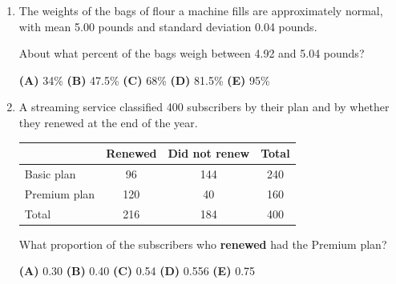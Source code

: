 \documentclass[12pt]{article}
\begin{document}
\begin{enumerate}[leftmargin=1.9em, itemsep=0.13in]
  \boxguard[8]
  \item The weights of the bags of flour a machine fills are approximately normal, with mean
        5.00 pounds and standard deviation 0.04 pounds.

        About what percent of the bags weigh between 4.92 and 5.04 pounds?\hfill{}\rule[-0.2in]{0pt}{0.48in}
        \par\vspace{3pt}\noindent
        \hspace{1.2em}\textbf{(A)} 34\% \hfill \textbf{(B)} 47.5\% \hfill
        \textbf{(C)} 68\% \hfill \textbf{(D)} 81.5\% \hfill \textbf{(E)} 95\%

  \boxguard[13]
  \item A streaming service classified 400 subscribers by their plan and by whether they
        renewed at the end of the year.

        \vspace{2pt}
        {\centering\small
        \renewcommand{\arraystretch}{1.15}
        \begin{tabular}{@{} l c c c @{}}
        \rowcolor{sky}
         & \textbf{Renewed} & \textbf{Did not renew} & \textbf{Total} \\
        \midrule
        Basic plan   & 96  & 144 & 240 \\
        Premium plan & 120 & 40  & 160 \\
        \midrule
        Total        & 216 & 184 & 400 \\
        \end{tabular}\par}
        \vspace{4pt}

        What proportion of the subscribers who \textbf{renewed} had the Premium plan?\hfill{}\rule[-0.2in]{0pt}{0.48in}
        \par\vspace{3pt}\noindent
        \hspace{1.2em}\textbf{(A)} 0.30 \hfill \textbf{(B)} 0.40 \hfill
        \textbf{(C)} 0.54 \hfill \textbf{(D)} 0.556 \hfill \textbf{(E)} 0.75


\end{enumerate}
\end{document}
